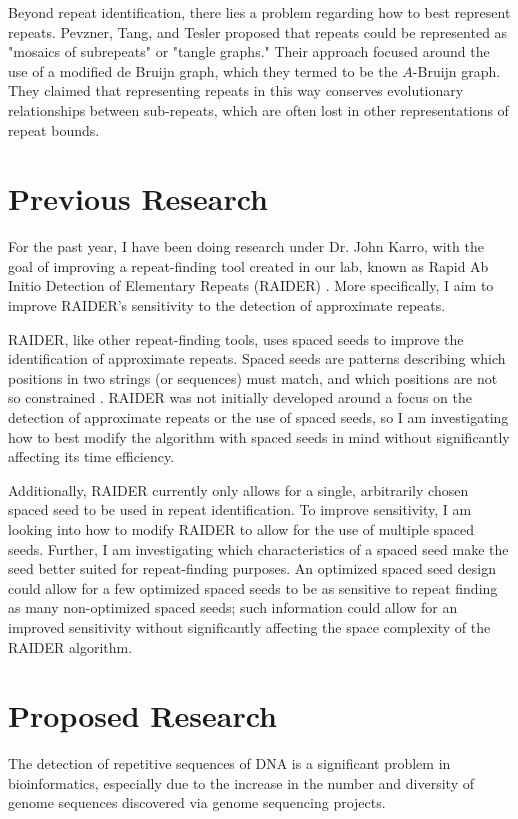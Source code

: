 \documentclass[12pt]{article}
\begin{document}

Beyond repeat identification, there lies a problem regarding how to best represent repeats. Pevzner, Tang, and Tesler \cite{pevzner2004de-novo} proposed that repeats could be represented as "mosaics of subrepeats" or "tangle graphs." Their approach focused around the use of a modified de Bruijn graph, which they termed to be the $A$-Bruijn graph. They claimed that representing repeats in this way conserves evolutionary relationships between sub-repeats, which are often lost in other representations of repeat bounds. 


\section*{Previous Research}
For the past year, I have been doing research under Dr. John Karro, with the goal of improving a repeat-finding tool created in our lab, known as Rapid Ab Initio Detection of Elementary Repeats (RAIDER) \cite{figueroa2013raiderpaper}. More specifically, I aim to improve RAIDER's sensitivity to the detection of approximate repeats. 

RAIDER, like other repeat-finding tools, uses spaced seeds to improve the identification of approximate repeats. Spaced seeds are patterns describing which positions in two strings (or sequences) must match, and which positions are not so constrained \cite{buhler2005designing}. RAIDER was not initially developed around a focus on the detection of approximate repeats or the use of spaced seeds, so I am investigating how to best modify the algorithm with spaced seeds in mind without significantly affecting its time efficiency. 

Additionally, RAIDER currently only allows for a single, arbitrarily chosen spaced seed to be used in repeat identification. To improve sensitivity, I am looking into how to modify RAIDER to allow for the use of multiple spaced seeds. Further, I am investigating which characteristics of a spaced seed make the seed better suited for repeat-finding purposes. An  optimized spaced seed design could allow for a few optimized spaced seeds to be as sensitive to repeat finding as many non-optimized spaced seeds; such information could allow for an improved sensitivity without significantly affecting the space complexity of the RAIDER algorithm.


\section*{Proposed Research}
The detection of repetitive sequences of DNA is a significant problem in bioinformatics, especially due to the increase in the number and diversity of genome sequences discovered via genome sequencing projects. 
\end{document}
